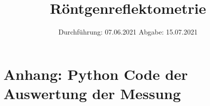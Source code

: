 

\usepackage{minted}



\subject{V44}  %
\title{Röntgenreflektometrie} %
\date{%
  Durchführung: 07.06.2021
  \hspace{3em}
  Abgabe: 15.07.2021
}



\maketitle
\thispagestyle{empty}
\tableofcontents
\newpage







\printbibliography{}

\section*{Anhang: Python Code der Auswertung der Messung}

\inputminted[linenos,breaklines]{python}{python/messung.py}


